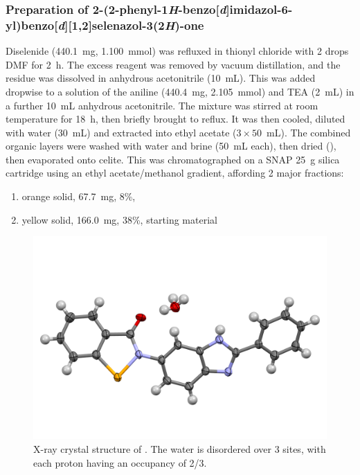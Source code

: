 \begin{refsection}
\subsubsection[Preparation of \refcmpd{ebs-rhs}]{Preparation of 2-(2-phenyl-1\emph{H}-benzo[\emph{d}]imidazol-6-yl)benzo[\emph{d}][1,2]selenazol-3(2\emph{H})-one }
Diselenide  (440.1~mg, 1.100~mmol) was refluxed in thionyl chloride with 2 drops DMF for 2~h. 
The excess reagent was removed by vacuum distillation, and the residue was dissolved in anhydrous acetonitrile (10~mL).
This was added dropwise to a solution of the aniline  (440.4~mg, 2.105~mmol) and TEA (2~mL) in a further 10~mL anhydrous acetonitrile.
The mixture was stirred at room temperature for 18~h, then briefly brought to reflux.
It was then cooled, diluted with water (30~mL) and extracted into ethyl acetate ($3\times50$~mL).
The combined organic layers were washed with water and brine (50~mL each), then dried (), then evaporated onto celite.
This was chromatographed on a SNAP 25~g silica cartridge using an ethyl acetate/methanol gradient, affording 2 major fractions:
\begin{enumerate}
    \item orange solid, 67.7~mg, 8\%, 
    \item yellow solid, 166.0~mg, 38\%, starting material 
\end{enumerate}

\begin{figure}[ht]
    \centering
    \includegraphics[width=0.8\linewidth]{Figures/ebs-rhs-xray.pdf}
    \caption{X-ray crystal structure of . The water is disordered over 3 sites, with each proton having an occupancy of 2/3.}
    \label{fig:ebs-rhs-xray}
\end{figure}


\end{refsection}
